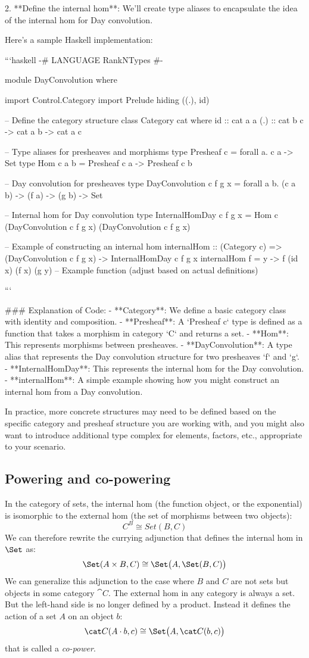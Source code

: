 \documentclass[DaoFP]{subfiles}
\begin{document}
2. **Define the internal hom**: We'll create type aliases to encapsulate the idea of the internal hom for Day convolution.

Here's a sample Haskell implementation:

```haskell
{-# LANGUAGE RankNTypes #-}

module DayConvolution where

import Control.Category
import Prelude hiding ((.), id)

-- Define the category structure
class Category cat where
    id :: cat a a
    (.) :: cat b c -> cat a b -> cat a c

-- Type aliases for presheaves and morphisms
type Presheaf c = forall a. c a -> Set
type Hom c a b = Presheaf c a -> Presheaf c b

-- Day convolution for presheaves
type DayConvolution c f g x = forall a b. (c a b) -> (f a) -> (g b) -> Set

-- Internal hom for Day convolution
type InternalHomDay c f g x = Hom c (DayConvolution c f g x) (DayConvolution c f g x)

-- Example of constructing an internal hom
internalHom :: (Category c) => (DayConvolution c f g x) -> InternalHomDay c f g x
internalHom f = \x y -> f (id x) (f x) (g y) -- Example function (adjust based on actual definitions)

```

### Explanation of Code:
- **Category**: We define a basic category class with identity and composition.
- **Presheaf**: A `Presheaf c` type is defined as a function that takes a morphism in category `C` and returns a set.
- **Hom**: This represents morphisms between presheaves.
- **DayConvolution**: A type alias that represents the Day convolution structure for two presheaves `f` and `g`.
- **InternalHomDay**: This represents the internal hom for the Day convolution.
- **internalHom**: A simple example showing how you might construct an internal hom from a Day convolution.

In practice, more concrete structures may need to be defined based on the specific category and presheaf structure you are working with, and you might also want to introduce additional type complex for elements, factors, etc., appropriate to your scenario.
\subsection{Powering and co-powering}

In the category of sets, the internal hom (the function object, or the exponential) is isomorphic to the external hom (the set of morphisms between two objects):
\[ C^B \cong Set(B, C) \]
We can therefore rewrite the currying adjunction that defines the internal hom in $\Set$ as:
\[ \Set (A \times B, C)  \cong \Set \big(A, \Set (B, C)\big) \]
We can generalize this adjunction to the case where $B$ and $C$ are not sets but objects in some category $\cat C$. The external hom in any category is always a set. But the left-hand side is no longer defined by a product. Instead it defines the action of a set $A$ on an object $b$:
\[ \cat C (A \cdot b, c) \cong \Set \big( A, \cat C (b, c)\big) \]
that is called a \emph{co-power}.
\end{document}
